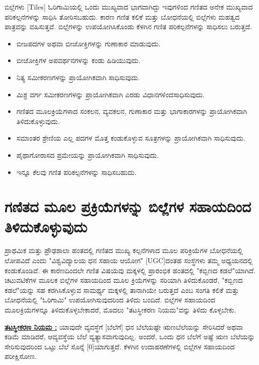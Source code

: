 ಬಿಲ್ಲೆಗಳು [Tiles] ಓರಿಗಾಮಿಯಲ್ಲಿ ಒಂದು ಮುಖ್ಯವಾದ ಭಾಗವಾಗಿದ್ದು ಇವುಗಳಿಂದ ಗಣಿತದ ಅನೇಕ ಮುಖ್ಯವಾದ ಪರಿಕಲ್ಪನೆಗಳನ್ನು ಸಾಧಿಸಿ ತೋರಿಸಬಹುದು. ಕಾರಣ ಗಣಿತ ಕಲಿಕೆ ಮತ್ತು ಬೋಧನೆಯಲ್ಲಿ ಬಿಲ್ಲೆಗಳು ಮಹತ್ವದ ಪಾತ್ರವನ್ನು ವಹಿಸುತ್ತವೆ. ಬಿಲ್ಲೆಗಳನ್ನು ಉಪಯೋಗಿಸಿಕೊಂಡು ಕೆಳಗಿನ ಗಣಿತ ಪರಿಕಲ್ಪನೆಗಳನ್ನು ಸಾಧಿಸಲು ಬರುತ್ತದೆ.
\begin{itemize}
\item ಬೀಜಪದಗಳ ಅಥವಾ ಬೀಜೋಕ್ತಿಗಳನ್ನು ಗುಣಾಕಾರ ಮಾಡುವುದು.
\item ಬೀಜೋಕ್ತಿಗಳ ಅಪವರ್ಥನಗಳನ್ನು ಕಂಡು ಹಿಡಿಯುವುದು. 
\item ನಿತ್ಯ ಸಮೀಕರಣಗಳನ್ನು ಪ್ರಾಯೋಗಿಕವಾಗಿ ಸಾಧಿಸುವುದು. 
\item ಮಿಶ್ರ ವರ್ಗ ಸಮೀಕರಣಗಳನ್ನು ಪ್ರಾಯೋಗಿಕವಾಗಿ ಎರಡು ವಿಧಾನಗಳಿಂದ\break ಸಾಧಿಸುವುದು. 
\item ಗಣಿತದ ಮೂಲಕ್ರಿಯೆಗಳಾದ ಸಂಕಲನ, ವ್ಯವಕಲನ, ಗುಣಾಕಾರ ಮತ್ತು ಭಾಗಾ\break ಕಾರಗಳನ್ನು ಪ್ರಾಯೋಗಿಕವಾಗಿ ತಿಳಿದುಕೊಳ್ಳುವುದು. 
\item ಸಮಾಂತರ ಶ್ರೇಣಿಯ ಎಲ್ಲ ಪದಗಳ ಮೊತ್ತ ಕಂಡುಕೊಳ್ಳುವ ಸೂತ್ರಗಳನ್ನು ಪ್ರಾಯೋಗಿಕವಾಗಿ ಸಾಧಿಸುವುದು.
\item ಪೈಥಾಗೋರಾಸದ ಪ್ರಮೇಯನ್ನು ಪ್ರಾಯೋಗಿಕವಾಗಿ ಸಾಧಿಸುವುದು.
\item ಇನ್ನೂ ಕೆಲವು ಗಣಿತ ಪರಿಕಲ್ಪನೆಗಳನ್ನು ಸಾಧಿಸಬಹುದು. 
\end{itemize}

\section{ಗಣಿತದ ಮೂಲ ಪ್ರಕ್ರಿಯೆಗಳನ್ನು ಬಿಲ್ಲೆಗಳ ಸಹಾಯದಿಂದ ತಿಳಿದು\break ಕೊಳ್ಳುವುದು}\label{sec3.2}%

ಪ್ರಾಥಮಿಕ ಮತ್ತು ಪ್ರೌಢಶಾಲಾ ಹಂತದಲ್ಲಿ ಗಣಿತದ ಮುಖ್ಯ ಕಲ್ಪನೆಗಳಾದ ಮೂಲ ಪರಿ\-ಕ್ರಿಯೆ\-ಗಳ ಬೋಧನೆಯಲ್ಲಿ ಲೋಪವಿದೆ ಎಂದು "ವಿಶ್ವವಿದ್ಯಾಲಯ ಧನ ಸಹಾಯ ಆಯೋಗ" [UGC]ದಂತಹ ಸಂಸ್ಥೆಗಳು ತಮ್ಮ ಅಧ್ಯಯನದಲ್ಲಿ ಕಂಡುಕೊಂಡಿವೆ. ಈ ಕಾರಣದಿಂದಲೇ ಗಣಿತ ವಿಷಯವು ಮಕ್ಕಳಲ್ಲಿ ಪ್ರಾರಂಭಿಕ ಹಂತದಲ್ಲಿ "ಕಬ್ಬಿಣದ ಕಡಲೆ"ಯಾಗಿದೆ. ಚಟುವಟಿಕೆಗಳ ಮೂಲಕ ಬಿಲ್ಲೆಗಳ ಸಹಾಯದಿಂದ ಮೂಲ ಕ್ರಿಯೆಗಳನ್ನು ಸರಿಯಾಗಿ ತಿಳಿದುಕೊಂಡರೆ, "ಕಬ್ಬಿಣದ ಕಡಲೆ"ಯನ್ನು ಸಹ ಕರಗಿಸಿಕೊಳ್ಳುವ ಸಾಮರ್ಥ್ಯ ಮಕ್ಕಳಲ್ಲಿ ತಾನಾಗಿಯೇ ಬರುತ್ತದೆ ಎಂಬ ಸಂಗತಿ ಕಲಿಕೆ ಮತ್ತು ಬೋಧನೆಯಲ್ಲಿ "ಓರಿಗಾಮಿ" ಉಪಯೋಗಿಸುವುದರಿಂದ ತಿಳಿದು ಬಂದಿದೆ. ಬಿಲ್ಲೆಗಳ ಸಹಾಯದಿಂದ ಮೂಲಕ್ರಿಯೆಗಳನ್ನೂ ತಿಳಿದುಕೊಳ್ಳಬೇಕಾದರೆ, ಮೊದಲು "ತಟಸ್ಥೀಕರಣ ನಿಯಮ"ವನ್ನು ತಿಳಿದು ಕೊಳ್ಳಬೇಕು.

\medskip
\noindent
\textbf{\underline{ತಟಸ್ಥೀಕರಣ ನಿಯಮ :}} ಯಾವುದೇ ವ್ಯವಸ್ಥೆಗೆ [ಬೆಲೆಗೆ] ಧನ ಬೆಲೆಯಷ್ಟೇ ಋಣಬೆಲೆ\-ಯನ್ನು ಸೇರಿಸಿದರೆ ಅಥವಾ ಕಡಿಮೆ ಮಾಡಿದರೆ, ಆವ್ಯವಸ್ಥೆಯ ಬೆಲೆ ವ್ಯತ್ಯಾಸವಾಗುವುದಿಲ್ಲ. \hbox{ಅಂದರೆ}, ಒಂದು ಧನ ಬೆಲೆಗೆ ಅಷ್ಟೆ ಋಣ ಬೆಲೆಯನ್ನು ಸೇರಿಸುವುದರಿಂದ ಒಟ್ಟು ಬೆಲೆ ಸೊನ್ನೆ [0]ಯಾಗುತ್ತದೆ. ಕೆಳಗಿನ ಉದಾಹರಣೆಗಳಲ್ಲಿ ಬಿಲ್ಲೆಗಳ ಸಹಾಯದಿಂದ ಪರೀಕ್ಷಿಸೋಣ.

